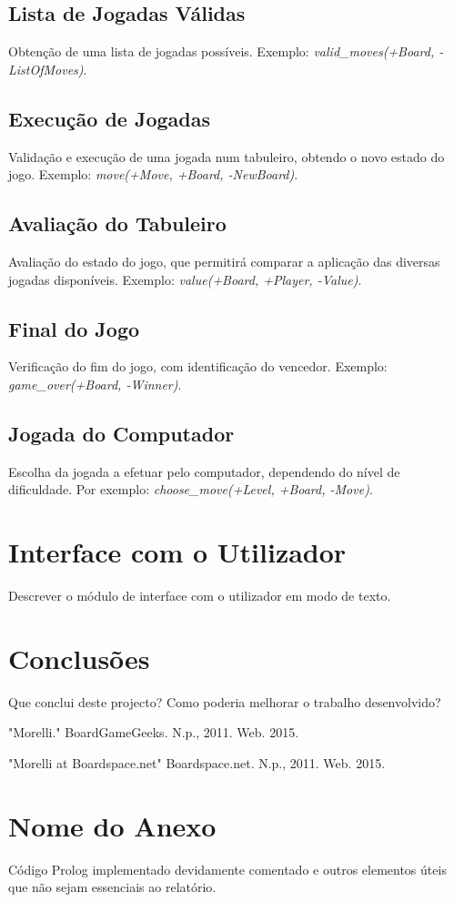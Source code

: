 \documentclass[a4paper]{article}
\begin{document}
\subsection{Lista de Jogadas Válidas} Obtenção de uma lista de jogadas possíveis. Exemplo: \textit{valid\_moves(+Board, -ListOfMoves)}.

\subsection{Execução de Jogadas} Validação e execução de uma jogada num tabuleiro, obtendo o novo estado do jogo. Exemplo: \textit{move(+Move, +Board, -NewBoard)}.

\subsection{Avaliação do Tabuleiro} Avaliação do estado do jogo, que permitirá comparar a aplicação das diversas jogadas disponíveis. Exemplo: \textit{value(+Board, +Player, -Value)}.

\subsection{Final do Jogo} Verificação do fim do jogo, com identificação do vencedor. Exemplo: \textit{game\_over(+Board, -Winner)}.

\subsection{Jogada do Computador} Escolha da jogada a efetuar pelo computador, dependendo do nível de dificuldade. Por exemplo: \textit{choose\_move(+Level, +Board, -Move)}.


\section{Interface com o Utilizador}

Descrever o módulo de interface com o utilizador em modo de texto.


\section{Conclusões}
Que conclui deste projecto? Como poderia melhorar o trabalho desenvolvido?


\clearpage
{}
\renewcommand\refname{Bibliografia}


\par "Morelli." BoardGameGeeks. N.p., 2011. Web. 2015.
\par "Morelli at Boardspace.net"  Boardspace.net. N.p., 2011. Web. 2015.

\newpage
\appendix
\section{Nome do Anexo}
Código Prolog implementado devidamente comentado e outros elementos úteis que não sejam essenciais ao relatório.
\end{document}
